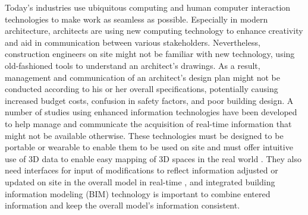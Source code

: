 Today's industries use ubiquitous computing and human computer interaction technologies to make work as seamless as possible. Especially in modern architecture, architects are using new computing technology to enhance creativity and aid in communication between various stakeholders. Nevertheless, construction engineers on site might not be familiar with new technology, using old-fashioned tools to understand an architect's drawings. As a result, management and communication of an architect's design plan might not be conducted according to his or her overall specifications, potentially causing increased budget costs, confusion in safety factors, and poor building design. A number of studies using enhanced information technologies have been developed to help manage and communicate the acquisition of real-time information that might not be available otherwise. These technologies must be designed to be portable or wearable to enable them to be used on site \cite{song_penlight:_2009, yeh_-site_2012} and must offer intuitive use of 3D data to enable easy mapping of 3D spaces in the real world \cite{chi_research_2013, yeh_-site_2012}. They also need interfaces for input of modifications to reflect information adjusted or updated on site in the overall model in real-time \cite{song_penlight:_2009}, and integrated building information modeling (BIM) technology is important to combine entered information and keep the overall model's information consistent. 

